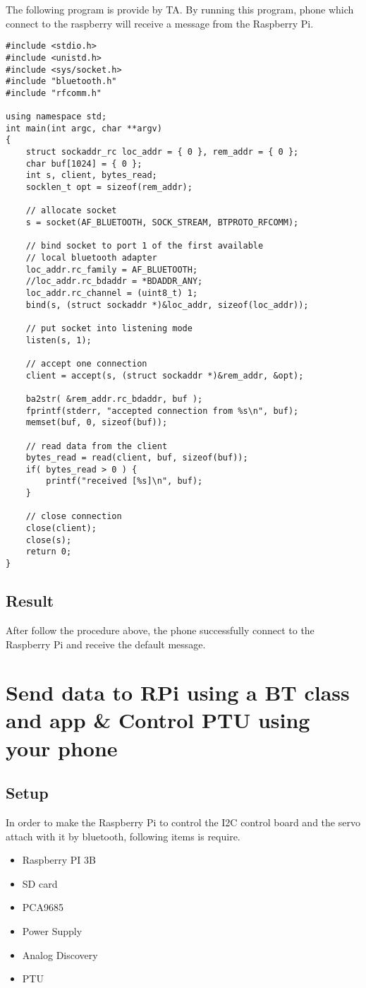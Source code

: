 \documentclass{article}
\begin{document}
The following program is provide by TA. By running this program, phone which connect to the raspberry will receive a message from the Raspberry Pi.
\begin{lstlisting}
#include <stdio.h>
#include <unistd.h>
#include <sys/socket.h>
#include "bluetooth.h"
#include "rfcomm.h"

using namespace std;
int main(int argc, char **argv)
{
	struct sockaddr_rc loc_addr = { 0 }, rem_addr = { 0 };
	char buf[1024] = { 0 };
	int s, client, bytes_read;
	socklen_t opt = sizeof(rem_addr);
	
	// allocate socket
	s = socket(AF_BLUETOOTH, SOCK_STREAM, BTPROTO_RFCOMM);
	
	// bind socket to port 1 of the first available 
	// local bluetooth adapter
	loc_addr.rc_family = AF_BLUETOOTH;
	//loc_addr.rc_bdaddr = *BDADDR_ANY;
	loc_addr.rc_channel = (uint8_t) 1;
	bind(s, (struct sockaddr *)&loc_addr, sizeof(loc_addr));
	
	// put socket into listening mode
	listen(s, 1);
	
	// accept one connection
	client = accept(s, (struct sockaddr *)&rem_addr, &opt);
	
	ba2str( &rem_addr.rc_bdaddr, buf );
	fprintf(stderr, "accepted connection from %s\n", buf);
	memset(buf, 0, sizeof(buf));
	
	// read data from the client
	bytes_read = read(client, buf, sizeof(buf));
	if( bytes_read > 0 ) {
		printf("received [%s]\n", buf);
	}
	
	// close connection
	close(client);
	close(s);
	return 0;
}
\end{lstlisting}
\subsection{Result}
After follow the procedure above, the phone successfully connect to the Raspberry Pi and receive the default message.
\clearpage


\section{Send data to RPi using a BT class and app \& Control PTU using your phone}
\subsection{Setup}
In order to make the Raspberry Pi to control the I2C control board and the servo attach with it by bluetooth, following items is require.
\begin{itemize}
	\item Raspberry PI 3B
	\item SD card
	\item PCA9685
	\item Power Supply
	\item Analog Discovery
	\item PTU
\end{itemize}
\end{document}
